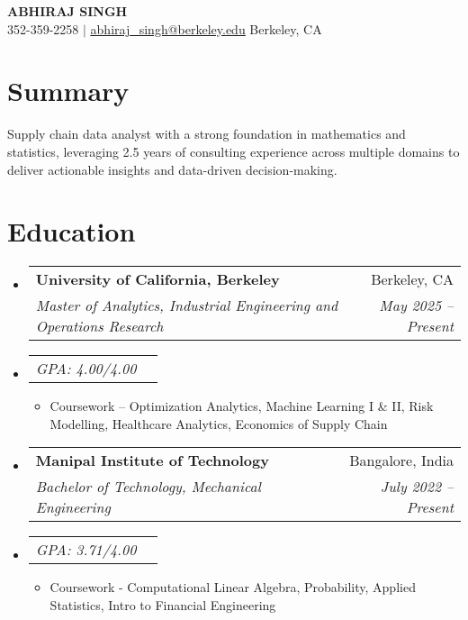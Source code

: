 \documentclass[letterpaper,11pt]{article}
\makeatletter
\newcommand{\resumeItem}[1]{
  \item\small{
    {#1 \vspace{-2pt}}
  }
}
\newcommand{\resumeSubheading}[4]{
  \vspace{-2pt}\item
    \begin{tabular*}{0.97\textwidth}[t]{l@{\extracolsep{\fill}}r}
      \textbf{#1} & #2 \\
      \textit{\small#3} & \textit{\small #4} \\
    \end{tabular*}\vspace{-7pt}
}
\newcommand{\resumeSubSubheading}[2]{
    \item
    \begin{tabular*}{0.97\textwidth}{l@{\extracolsep{\fill}}r}
      \textit{\small#1} & \textit{\small #2} \\
    \end{tabular*}\vspace{-7pt}
}
\newcommand{\resumeSubHeadingListStart}{\begin{itemize}[leftmargin=0.15in, label={}]}
\newcommand{\resumeSubHeadingListEnd}{\end{itemize}}
\newcommand{\resumeItemListStart}{\begin{itemize}}
\newcommand{\resumeItemListEnd}{\end{itemize}\vspace{-5pt}}
\makeatother
\begin{document}
\setlength{\pdfpageheight}{14.00in}

\begin{center}
    \textbf{\Huge \scshape ABHIRAJ SINGH} \\ \vspace{1pt}
    \small 352-359-2258 $|$ \href{mailto:abhiraj_singh@berkeley.edu}{\underline{abhiraj\_singh@berkeley.edu}}
    \small Berkeley, CA
\end{center}

\section*{Summary} %
  Supply chain data analyst with a strong foundation in mathematics and statistics, leveraging 2.5 years of consulting experience across multiple domains to deliver actionable insights and data-driven decision-making.

\section{Education}
  \resumeSubHeadingListStart
    \resumeSubheading
      {University of California, Berkeley}{Berkeley, CA}
      {Master of Analytics, Industrial Engineering and Operations Research}{May 2025 -- Present}
    \resumeSubSubheading{GPA: 4.00/4.00}{}
      \resumeItemListStart
        \resumeItem{Coursework – Optimization Analytics, Machine Learning I \& II, Risk Modelling, Healthcare Analytics, Economics of Supply Chain}
      \resumeItemListEnd
    \resumeSubheading
      {Manipal Institute of Technology}{Bangalore, India}
      {Bachelor of Technology, Mechanical Engineering}{July 2022 -- Present}
    \resumeSubSubheading{GPA: 3.71/4.00}{}
      \resumeItemListStart
        \resumeItem{Coursework - Computational Linear Algebra, Probability, Applied Statistics, Intro to Financial Engineering}
      \resumeItemListEnd
  \resumeSubHeadingListEnd
\end{document}
